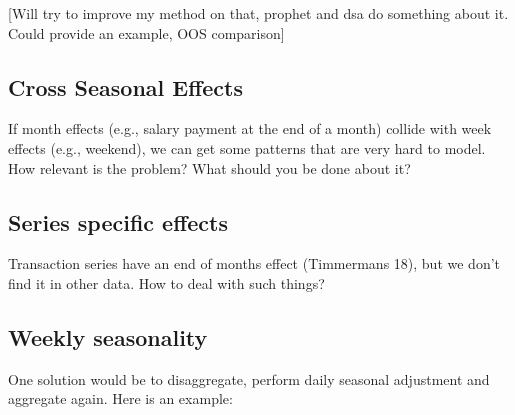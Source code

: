{[}Will try to improve my method on that, prophet and dsa do something
about it. Could provide an example, OOS comparison{]}

\hypertarget{cross-seasonal-effects}{%
\subsection{Cross Seasonal Effects}\label{cross-seasonal-effects}}

If month effects (e.g., salary payment at the end of a month) collide
with week effects (e.g., weekend), we can get some patterns that are
very hard to model. How relevant is the problem? What should you be done
about it?

\hypertarget{series-specific-effects}{%
\subsection{Series specific effects}\label{series-specific-effects}}

Transaction series have an end of months effect (Timmermans 18), but we
don't find it in other data. How to deal with such things?

\hypertarget{weekly-seasonality}{%
\subsection{Weekly seasonality}\label{weekly-seasonality}}

One solution would be to disaggregate, perform daily seasonal adjustment
and aggregate again. Here is an example:

